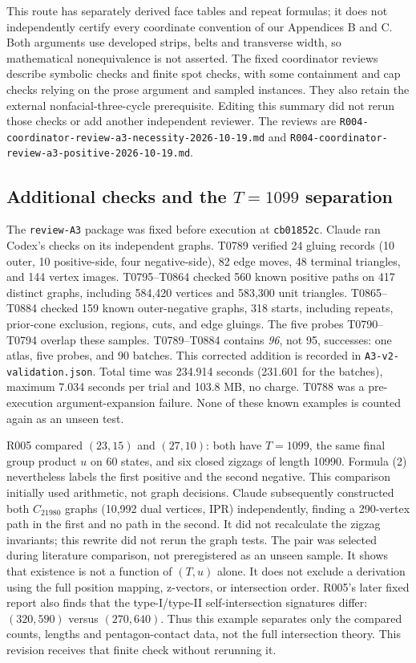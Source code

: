 \documentclass[11pt]{amsart}
\newcommand{\record}[1]{\nolinkurl{#1}}
\begin{document}
This route has separately derived face tables and repeat formulas;
it does not independently certify every coordinate convention of our
Appendices B and C. Both arguments use developed strips, belts and
transverse width, so mathematical nonequivalence is not asserted.
The fixed coordinator reviews describe symbolic checks and finite
spot checks, with some containment and cap checks relying on the
prose argument and sampled instances. They also retain the external
nonfacial-three-cycle prerequisite. Editing this summary did not rerun
those checks or add another independent reviewer. The reviews are
\record{R004-coordinator-review-a3-necessity-2026-10-19.md} and
\record{R004-coordinator-review-a3-positive-2026-10-19.md}.

\subsection{Additional checks and the \texorpdfstring{$T=1099$}{T=1099} separation}
The \record{review-A3} package was fixed before execution at
\record{cb01852c}. Claude ran Codex's checks on its independent graphs.
T0789 verified 24 gluing records (10 outer, 10 positive-side, four
negative-side), 82 edge moves, 48 terminal triangles, and 144 vertex
images. T0795--T0864 checked 560 known positive paths on 417 distinct
graphs, including 584,420 vertices and 583,300 unit triangles.
T0865--T0884 checked 159 known outer-negative graphs, 318 starts,
including repeats, prior-cone exclusion, regions, cuts, and edge gluings.
The five probes T0790--T0794 overlap these samples. T0789--T0884
contains \emph{96}, not 95, successes: one atlas, five probes, and
90 batches. This corrected addition is recorded in
\record{A3-v2-validation.json}. Total time was 234.914 seconds (231.601
for the batches), maximum 7.034 seconds per trial and 103.8 MB, no
charge. T0788 was a pre-execution argument-expansion failure. None of
these known examples is counted again as an unseen test.

R005 compared $(23,15)$ and $(27,10)$: both have $T=1099$, the same
final group product $u$ on 60 states, and six closed zigzags of length
10990. Formula (2) nevertheless labels the first positive and the
second negative. This comparison initially used arithmetic, not graph
decisions. Claude subsequently constructed both $C_{21980}$ graphs
(10,992 dual vertices, IPR) independently, finding a 290-vertex path
in the first and no path in the second. It did not recalculate the
zigzag invariants; this rewrite did not rerun the graph tests.
The pair was selected during literature comparison, not preregistered
as an unseen sample. It shows that existence is not a function of
$(T,u)$ alone. It does not exclude a derivation using the full position
mapping, z-vectors, or intersection order. R005's later fixed report
also finds that the type-I/type-II self-intersection signatures differ:
$(320,590)$ versus $(270,640)$. Thus this example separates only the
compared counts, lengths and pentagon-contact data, not the full
intersection theory. This revision receives that finite check without
rerunning it.
\end{document}
